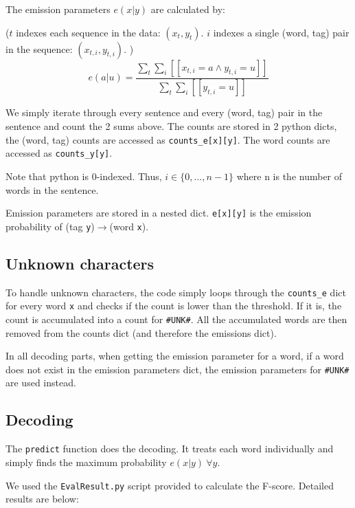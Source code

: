 \documentclass[12pt]{article}
\begin{document}
The emission parameters \(e(x|y)\) are calculated by:

(\(t\) indexes each sequence in the data: \((x_t, y_t)\). \(i\) indexes a single (word, tag) pair in the sequence: \((x_{t,i}, y_{t,i})\). )
\[ e(a|u) = \frac{\sum_t \sum_i [[x_{t,i}=a \land y_{t,i}=u]] }{\sum_{t} \sum_i [[y_{t,i}=u]] } \]

We simply iterate through every sentence and every (word, tag) pair in the sentence and count the 2 sums above.
The counts are stored in 2 python dicts, the (word, tag) counts are accessed as \verb|counts_e[x][y]|. The word counts are accessed as \verb|counts_y[y]|.

Note that python is 0-indexed. Thus, \(i \in \{0,...,n-1\}\) where n is the number of words in the sentence.

Emission parameters are stored in a nested dict. \verb|e[x][y]| is the emission probability of (tag \verb|y|)\(\rightarrow\)(word \verb|x|).

\subsection{Unknown characters}

To handle unknown characters, the code simply loops through the \verb|counts_e| dict for every word \texttt{x} and checks if the count is lower than the threshold. If it is, the count is accumulated into a count for \texttt{\#UNK\#}. All the accumulated words are then removed from the counts dict (and therefore the emissions dict).

In all decoding parts, when getting the emission parameter for a word, if a word does not exist in the emission parameters dict, the emission parameters for \texttt{\#UNK\#} are used instead.

\subsection{Decoding}

The \texttt{predict} function does the decoding. It treats each word individually and simply finds the maximum probability \( e(x|y) \ \forall y \).

We used the \texttt{EvalResult.py} script provided to calculate the F-score. Detailed results are below:
\end{document}
